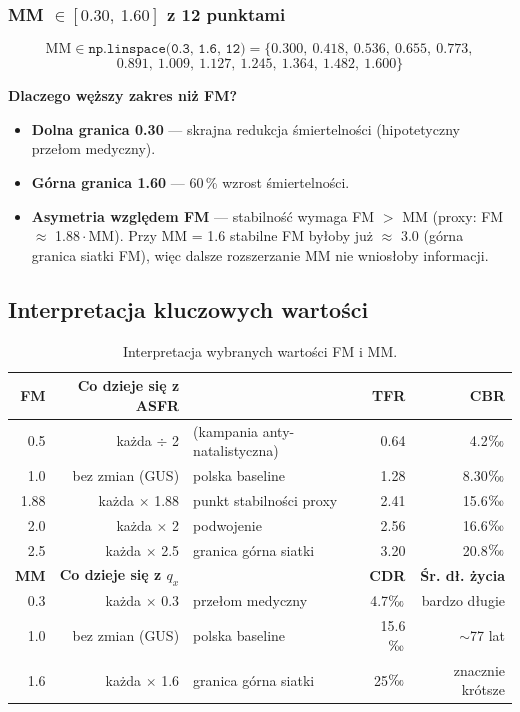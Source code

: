 \documentclass[11pt,a4paper]{article}
\newcommand{\promile}{\ensuremath{\text{\textperthousand}}}
\begin{document}
\subsubsection{MM $\in [0.30,\ 1.60]$ z 12 punktami}

\begin{formulabox}
\[
\text{MM} \in \texttt{np.linspace(0.3, 1.6, 12)} = \{0.300,\ 0.418,\ 0.536,\ 0.655,\ 0.773,\]
\[0.891,\ 1.009,\ 1.127,\ 1.245,\ 1.364,\ 1.482,\ 1.600\}
\]
\end{formulabox}

\textbf{Dlaczego węższy zakres niż FM?}
\begin{itemize}[leftmargin=*]
  \item \textbf{Dolna granica 0.30} --- skrajna redukcja śmiertelności (hipotetyczny przełom medyczny).
  \item \textbf{Górna granica 1.60} --- 60\,\% wzrost śmiertelności.
  \item \textbf{Asymetria względem FM} --- stabilność wymaga FM $>$ MM (proxy: FM $\approx$ 1.88\,$\cdot$\,MM). Przy MM = 1.6 stabilne FM byłoby już $\approx$ 3.0 (górna granica siatki FM), więc dalsze rozszerzanie MM nie wniosłoby informacji.
\end{itemize}

\subsection{Interpretacja kluczowych wartości}

\begin{table}[h]
\centering
\small
\begin{tabular}{rrlrr}
\toprule
\textbf{FM} & \textbf{Co dzieje się z ASFR} & & \textbf{TFR} & \textbf{CBR} \\
\midrule
0.5 & każda $\div$ 2     & (kampania anty-natalistyczna) & 0.64 & 4.2\promile \\
1.0 & bez zmian (GUS)    & polska baseline               & 1.28 & 8.30\promile \\
1.88 & każda $\times$ 1.88 & punkt stabilności proxy      & 2.41 & 15.6\promile \\
2.0 & każda $\times$ 2   & podwojenie                    & 2.56 & 16.6\promile \\
2.5 & każda $\times$ 2.5 & granica górna siatki          & 3.20 & 20.8\promile \\
\midrule
\textbf{MM} & \textbf{Co dzieje się z $q_x$} & & \textbf{CDR} & \textbf{Śr. dł. życia} \\
\midrule
0.3 & każda $\times$ 0.3 & przełom medyczny              & 4.7\promile & bardzo długie \\
1.0 & bez zmian (GUS)    & polska baseline               & 15.6\promile & $\sim$77 lat \\
1.6 & każda $\times$ 1.6 & granica górna siatki          & 25\promile & znacznie krótsze \\
\bottomrule
\end{tabular}
\caption{Interpretacja wybranych wartości FM i MM.}
\end{table}
\end{document}
